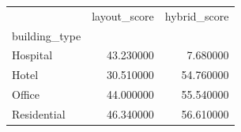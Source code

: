\begin{tabular}{lrr}
 & layout_score & hybrid_score \\
building_type &  &  \\
Hospital & 43.230000 & 7.680000 \\
Hotel & 30.510000 & 54.760000 \\
Office & 44.000000 & 55.540000 \\
Residential & 46.340000 & 56.610000 \\
\end{tabular}
